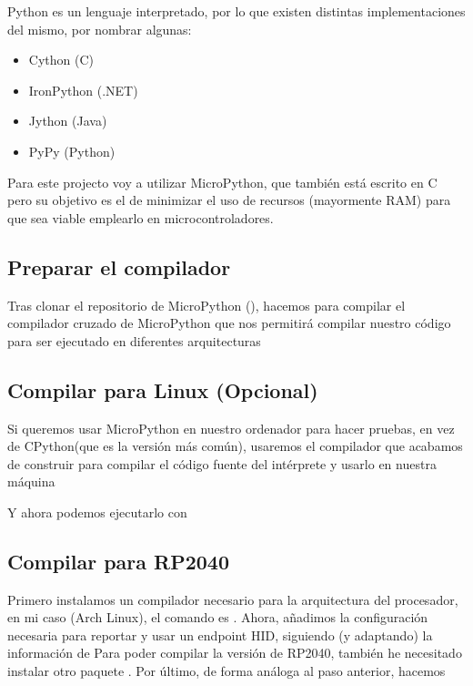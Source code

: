 Python es un lenguaje interpretado, por lo que existen distintas implementaciones del mismo, por nombrar algunas: 
\begin{itemize}
  \item Cython (C)
  \item IronPython (.NET)
  \item Jython (Java)
  \item PyPy (Python)
\end{itemize}
Para este projecto voy a utilizar MicroPython, que también está escrito en C pero su objetivo es el de minimizar el uso de recursos (mayormente RAM) para que sea viable emplearlo en microcontroladores.

\subsection{Preparar el compilador}
Tras clonar el repositorio de MicroPython (), hacemos  para compilar el compilador cruzado de MicroPython que nos permitirá compilar nuestro código para ser ejecutado en diferentes arquitecturas

\subsection{Compilar para Linux (Opcional)}
Si queremos usar MicroPython en nuestro ordenador para hacer pruebas, en vez de CPython(que es la versión más común), usaremos el compilador que acabamos de construir para compilar el código fuente del intérprete y usarlo en nuestra máquina 

Y ahora podemos ejecutarlo con 

\subsection{Compilar para RP2040}
Primero instalamos un compilador necesario para la arquitectura del procesador, en mi caso (Arch Linux), el comando es . \newline
Ahora, añadimos la configuración necesaria para reportar y usar un endpoint HID, siguiendo (y adaptando) la información de \textbf{\textcite{tusb-rp2}}
Para poder compilar la versión de RP2040, también he necesitado instalar otro paquete . Por último, de forma análoga al paso anterior, hacemos 
